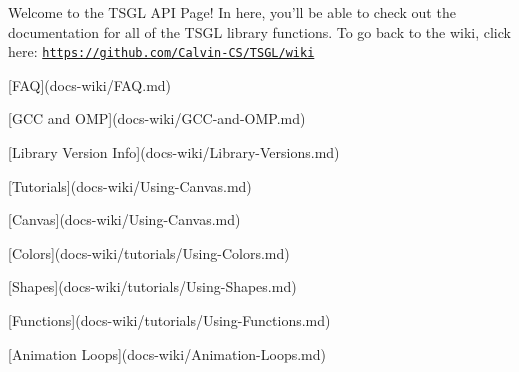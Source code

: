 \-Welcome to the \-T\-S\-G\-L \-A\-P\-I \-Page! \-In here, you'll be able to check out the documentation for all of the \-T\-S\-G\-L library functions. \-To go back to the wiki, click here\-: \href{https://github.com/Calvin-CS/TSGL/wiki}{\tt https\-://github.\-com/\-Calvin-\/\-C\-S/\-T\-S\-G\-L/wiki}
\begin{DoxyItemize}
\item \mbox{[}\-F\-A\-Q\mbox{]}(docs-\/wiki/\-F\-A\-Q.\-md)
\item \mbox{[}\-G\-C\-C and \-O\-M\-P\mbox{]}(docs-\/wiki/\-G\-C\-C-\/and-\/\-O\-M\-P.\-md)
\item \mbox{[}\-Library \-Version \-Info\mbox{]}(docs-\/wiki/\-Library-\/\-Versions.\-md)
\item \mbox{[}\-Tutorials\mbox{]}(docs-\/wiki/\-Using-\/\-Canvas.\-md)
\begin{DoxyItemize}
\item \mbox{[}\-Canvas\mbox{]}(docs-\/wiki/\-Using-\/\-Canvas.\-md)
\item \mbox{[}\-Colors\mbox{]}(docs-\/wiki/tutorials/\-Using-\/\-Colors.\-md)
\item \mbox{[}\-Shapes\mbox{]}(docs-\/wiki/tutorials/\-Using-\/\-Shapes.\-md)
\item \mbox{[}\-Functions\mbox{]}(docs-\/wiki/tutorials/\-Using-\/\-Functions.\-md)
\item \mbox{[}\-Animation \-Loops\mbox{]}(docs-\/wiki/\-Animation-\/\-Loops.\-md)
\end{DoxyItemize}
\end{DoxyItemize}
